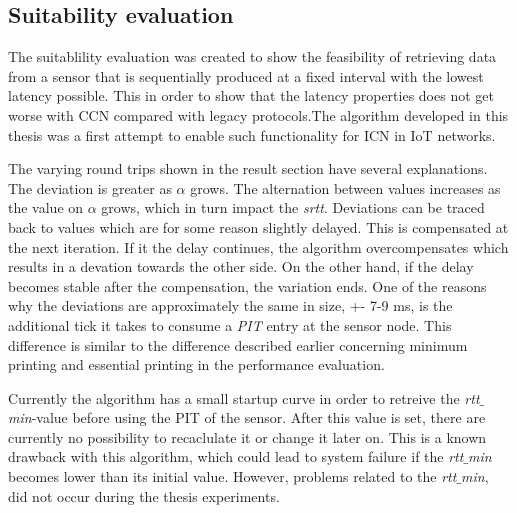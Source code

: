 \subsection{Suitability evaluation}
The suitablility evaluation was created to show the feasibility of retrieving data from a sensor that is sequentially produced at a fixed interval with the lowest latency possible. This in order to show that the latency properties does not get worse with CCN compared with legacy protocols.The algorithm developed in this thesis was a first attempt to enable such functionality for ICN in IoT networks.

The varying round trips shown in the result section have several explanations. The deviation is greater as $\alpha$ grows.
The alternation between values increases as the value on $\alpha$ grows, which in turn impact the \textit{srtt}. 
Deviations can be traced back to values which are for some reason slightly delayed. This is compensated at the next iteration. If it the delay continues, the algorithm overcompensates which results in a devation towards the other side. On the other hand, if the delay becomes stable after the compensation, the variation ends.
One of the reasons why the deviations are approximately the same in size, +- 7-9 ms, is the additional tick it takes to consume a \textit{PIT} entry at the sensor node. This difference is similar to the difference described earlier concerning minimum printing and essential printing in the performance evaluation.

Currently the algorithm has a small startup curve in order to retreive the \textit{rtt$\_$min}-value before using the PIT of the sensor. After this value is set, there are currently no possibility to recaclulate it or change it later on. This is a known drawback with this algorithm, which could lead to system failure if the \textit{rtt$\_$min} becomes lower than its initial value. However, problems related to the \textit{rtt$\_$min}, did not occur during the thesis experiments.

